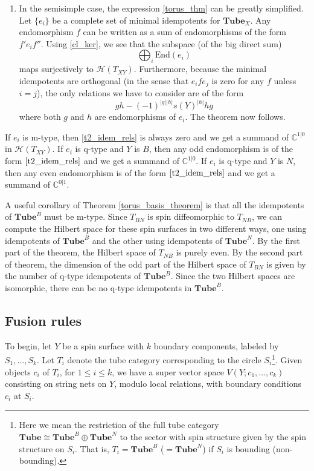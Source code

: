 \documentclass[12pt,a4paper]{article}
\newcommand{\cc}{\mathbb{C}}
\newcommand{\mch}{\mathcal{H}}
\newcommand\be            {\begin{equation}}
\newcommand\ee            {\end{equation}}
\newcommand{\End}{\text{End}}
\newcommand{\tube}{\textbf{Tube}}
\begin{document}
\begin{enumerate}
\item In the semisimple case, the expression \eqref{torus_thm} can be greatly simplified.
Let $\{e_i\}$ be a complete set of minimal idempotents for $\tube_X$.
Any endomorphism $f$ can be written as a sum of endomorphisms of the form $f' e_i f''$.
Using \eqref{cl_ker}, we see that the subspace (of the big direct sum)
\be
	\bigoplus_i \End(e_i)
\ee
maps surjectively to $\mch(T_{XY})$.
Furthermore, because the minimal idempotents are orthogonal (in the sense that $e_i f e_j$ is zero for any $f$ unless $i=j$),
the only relations we have to consider are of the form
\be \label{t2_idem_rels}
	gh - (-1)^{|g| |h|} s(Y)^{|h|} hg
\ee
where both $g$ and $h$ are endomorphisms of $e_i$.
The theorem now follows.
\end{enumerate}

If $e_i$ is m-type, then \eqref{t2_idem_rels} is always zero and we get a summand of $\cc^{1|0}$ in $\mch(T_{XY})$.
If $e_i$ is q-type and $Y$ is $B$, then any odd endomorphism is of the form $\eqref{t2_idem_rels}$
and we get a summand of $\cc^{1|0}$.
If $e_i$ is q-type and $Y$ is $N$, then any even endomorphism is of the form $\eqref{t2_idem_rels}$
and we get a summand of $\cc^{0|1}$.

A useful corollary of Theorem \ref{torus_basis_theorem} is that all the idempotents of 
$\tube^B$ must be m-type.
Since $T_{BN}$ is spin diffeomorphic to $T_{NB}$, we can compute the Hilbert space for 
these spin surfaces in two different ways, one using
idempotents of $\tube^B$ and the other using idempotents of $\tube^N$.
By the first part of the theorem, the Hilbert space of $T_{NB}$ is purely even.
By the second part of theorem, the dimension of the odd part of the Hilbert space of $T_{BN}$
is given by the number of q-type idempotents of $\tube^B$.
Since the two Hilbert spaces are isomorphic, there can be no q-type idempotents in $\tube^B$.



\subsection{Fusion rules} \label{fusion_rules}

To begin, let $Y$ be a spin surface with $k$ boundary components, labeled by $S_1,\ldots,S_k$.
Let $T_i$ denote the tube category corresponding to the circle $S_i$\footnote{Here we mean the 
restriction of the full tube category $\tube \cong \tube^B \oplus \tube^N$ to the sector with 
spin structure given by the spin structure on $S_i$. 
That is, $T_i = \tube^B$ ($=\tube^N$) if $S_i$ is bounding (non-bounding).}.
Given objects $c_i$ of $T_i$, for $1\le i \le k$, we have a super vector space $V(Y; c_1,\ldots,c_k)$ consisting on string nets
on $Y$, modulo local relations, with boundary conditions $c_i$ at $S_i$.
\end{document}
